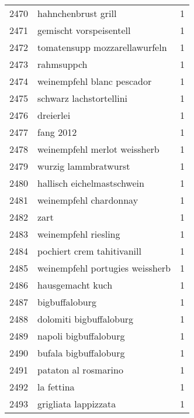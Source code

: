 \begin{tabular}{llr}
2470 &                                hahnchenbrust grill &      1 \\
2471 &                            gemischt vorspeisentell &      1 \\
2472 &                      tomatensupp mozzarellawurfeln &      1 \\
2473 &                                         rahmsuppch &      1 \\
2474 &                         weinempfehl blanc pescador &      1 \\
2475 &                            schwarz lachstortellini &      1 \\
2476 &                                          dreierlei &      1 \\
2477 &                                          fang 2012 &      1 \\
2478 &                       weinempfehl merlot weissherb &      1 \\
2479 &                               wurzig lammbratwurst &      1 \\
2480 &                         hallisch eichelmastschwein &      1 \\
2481 &                             weinempfehl chardonnay &      1 \\
2482 &                                               zart &      1 \\
2483 &                               weinempfehl riesling &      1 \\
2484 &                         pochiert crem tahitivanill &      1 \\
2485 &                    weinempfehl portugies weissherb &      1 \\
2486 &                                   hausgemacht kuch &      1 \\
2487 &                                     bigbuffaloburg &      1 \\
2488 &                            dolomiti bigbuffaloburg &      1 \\
2489 &                              napoli bigbuffaloburg &      1 \\
2490 &                              bufala bigbuffaloburg &      1 \\
2491 &                               pataton al rosmarino &      1 \\
2492 &                                         la fettina &      1 \\
2493 &                               grigliata lappizzata &      1 \\

\end{tabular}
